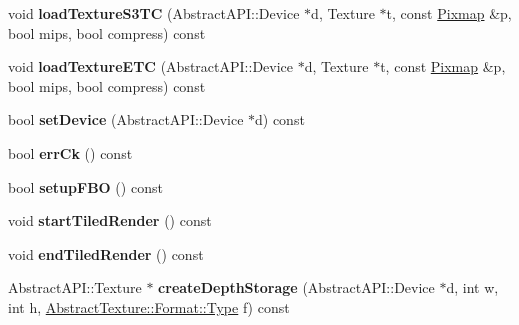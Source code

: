 \begin{DoxyCompactItemize}
\item 
\hypertarget{class_tempest_1_1_opengl2x_ac58c4cb87a3d478bac4bc21920c053ce}{void {\bfseries load\+Texture\+S3\+T\+C} (Abstract\+A\+P\+I\+::\+Device $\ast$d, Texture $\ast$t, const \hyperlink{class_tempest_1_1_pixmap}{Pixmap} \&p, bool mips, bool compress) const }\label{class_tempest_1_1_opengl2x_ac58c4cb87a3d478bac4bc21920c053ce}

\item 
\hypertarget{class_tempest_1_1_opengl2x_ab51a9e0a8015f0d276d6302f03b8930b}{void {\bfseries load\+Texture\+E\+T\+C} (Abstract\+A\+P\+I\+::\+Device $\ast$d, Texture $\ast$t, const \hyperlink{class_tempest_1_1_pixmap}{Pixmap} \&p, bool mips, bool compress) const }\label{class_tempest_1_1_opengl2x_ab51a9e0a8015f0d276d6302f03b8930b}

\item 
\hypertarget{class_tempest_1_1_opengl2x_a37849cbb8564d483c0498e2af650b8e5}{bool {\bfseries set\+Device} (Abstract\+A\+P\+I\+::\+Device $\ast$d) const }\label{class_tempest_1_1_opengl2x_a37849cbb8564d483c0498e2af650b8e5}

\item 
\hypertarget{class_tempest_1_1_opengl2x_aa6d0cef3572f2805afb1ca0c1a021948}{bool {\bfseries err\+Ck} () const }\label{class_tempest_1_1_opengl2x_aa6d0cef3572f2805afb1ca0c1a021948}

\item 
\hypertarget{class_tempest_1_1_opengl2x_a6680d09c6e94e2ad02a71357496e2420}{bool {\bfseries setup\+F\+B\+O} () const }\label{class_tempest_1_1_opengl2x_a6680d09c6e94e2ad02a71357496e2420}

\item 
\hypertarget{class_tempest_1_1_opengl2x_a6f3210f5558beed3b11e9f8ab6491f14}{void {\bfseries start\+Tiled\+Render} () const }\label{class_tempest_1_1_opengl2x_a6f3210f5558beed3b11e9f8ab6491f14}

\item 
\hypertarget{class_tempest_1_1_opengl2x_a9ea0f9ab4d48970ddd672ce48a806421}{void {\bfseries end\+Tiled\+Render} () const }\label{class_tempest_1_1_opengl2x_a9ea0f9ab4d48970ddd672ce48a806421}

\item 
\hypertarget{class_tempest_1_1_opengl2x_a8574d3ce92ae968f5088e054e858be65}{Abstract\+A\+P\+I\+::\+Texture $\ast$ {\bfseries create\+Depth\+Storage} (Abstract\+A\+P\+I\+::\+Device $\ast$d, int w, int h, \hyperlink{struct_tempest_1_1_abstract_texture_1_1_format_a231a1f516e53783bf72c713669b115b3}{Abstract\+Texture\+::\+Format\+::\+Type} f) const }\label{class_tempest_1_1_opengl2x_a8574d3ce92ae968f5088e054e858be65}

\end{DoxyCompactItemize}
